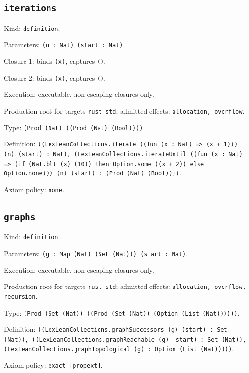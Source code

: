 \documentclass[11pt]{article}
\begin{document}
\subsection*{\texttt{iterations}}
\noindent Kind: \texttt{definition}.\par
\noindent Parameters: \texttt{(n : Nat) (start : Nat)}.\par
\noindent Closure 1: binds \texttt{(x)}, captures \texttt{()}.\par
\noindent Closure 2: binds \texttt{(x)}, captures \texttt{()}.\par
\noindent Execution: executable, non-escaping closures only.\par
\noindent Production root for targets \texttt{rust-std}; admitted effects: \texttt{allocation, overflow}.\par
\noindent Type: \texttt{(Prod (Nat) ((Prod (Nat) (Bool))))}.\par
\noindent Definition: \texttt{((LexLeanCollections.iterate ((fun (x : Nat) => (x + 1))) (n) (start) : Nat), (LexLeanCollections.iterateUntil ((fun (x : Nat) => (if (Nat.blt (x) (10)) then Option.some ((x + 2)) else Option.none))) (n) (start) : (Prod (Nat) (Bool))))}.\par
\noindent Axiom policy: \texttt{none}.\par
\subsection*{\texttt{graphs}}
\noindent Kind: \texttt{definition}.\par
\noindent Parameters: \texttt{(g : Map (Nat) (Set (Nat))) (start : Nat)}.\par
\noindent Execution: executable, non-escaping closures only.\par
\noindent Production root for targets \texttt{rust-std}; admitted effects: \texttt{allocation, overflow, recursion}.\par
\noindent Type: \texttt{(Prod (Set (Nat)) ((Prod (Set (Nat)) (Option (List (Nat))))))}.\par
\noindent Definition: \texttt{((LexLeanCollections.graphSuccessors (g) (start) : Set (Nat)), ((LexLeanCollections.graphReachable (g) (start) : Set (Nat)), (LexLeanCollections.graphTopological (g) : Option (List (Nat)))))}.\par
\noindent Axiom policy: \texttt{exact [propext]}.\par
\end{document}
